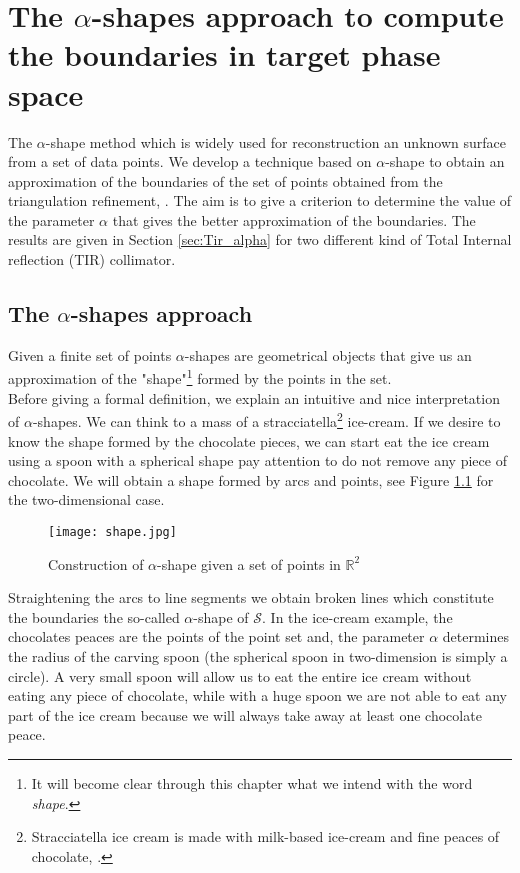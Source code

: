\chapter{The $\alpha$-shapes approach to compute the boundaries in target phase space}\label{chap:boundaries_alpha}
The $\alpha$-shape method which is widely used for reconstruction an unknown surface from a set of data points.
We develop a technique based on $\alpha$-shape to obtain an approximation of the boundaries of the set of points obtained from the triangulation refinement, \cite{guo1997surface}.
The aim is to give a criterion to determine the value of the parameter $\alpha$ that gives the better approximation of the boundaries.
The results are given in Section \ref{sec:Tir_alpha} for two different kind of Total Internal reflection (TIR) collimator.
\section{The $\alpha$-shapes approach}
Given a finite set  of points $\alpha$-shapes are geometrical objects that give us an approximation of the "shape"\footnote{It will become clear through this chapter what we intend with the word \textit{shape}.} formed by the points in the set.\\ \indent
Before giving a formal definition, we explain an intuitive and nice interpretation of $\alpha$-shapes. 
We can think to a mass of a stracciatella\footnote{Stracciatella ice cream is made with milk-based ice-cream and fine peaces of chocolate, \cite{Wiki3}.} ice-cream. If we desire to know the shape formed by the chocolate pieces, we can start eat the ice cream using a spoon with a spherical shape pay attention to do not remove any piece of chocolate. 
We will obtain a shape formed by arcs and points, see Figure \ref{fig:shape2d} for the two-dimensional case.
\begin{figure}[htbp]\label{fig:shape2d}
\begin{center}
\texttt{[image: shape.jpg]}
\label{fig:shape}
\caption{Construction of $\alpha$-shape given a set of points in $\mathbb{R}^2$}
\label{fig:shape2d}
\end{center}
\end{figure}
Straightening the arcs to line segments we obtain broken lines which constitute the boundaries the so-called $\alpha$-shape of $\mathcal{S}$. In the ice-cream example, the chocolates peaces are the points of the point set and, the parameter $\alpha$ determines the radius of the carving spoon (the spherical spoon in two-dimension is simply a circle). A very small spoon will allow us to eat the entire ice cream without eating any piece of chocolate, while with a huge spoon we are not able to eat any part of the ice cream because we will always take away at least one chocolate peace.\\ \indent 
